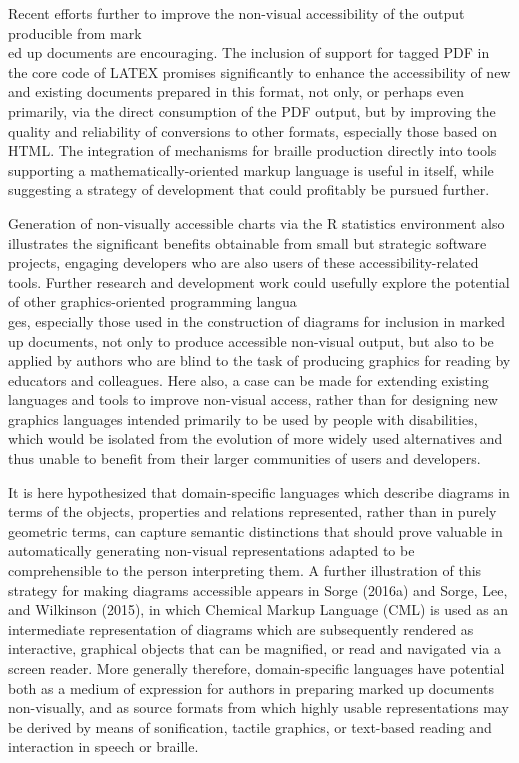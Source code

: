 \documentclass[11pt]{sig-alternate}
\begin{document}
\begin{large}
Recent efforts further to improve the non-visual accessibility of the output producible from mark\\ed up documents are encouraging. The inclusion of support for tagged PDF in the core code of LATEX promises significantly to enhance the accessibility of new and existing documents prepared in this format, not only, or perhaps even primarily, via the direct consumption of the PDF output, but by improving the quality and reliability of conversions to other formats, especially those based on HTML. The integration of mechanisms for braille production directly into tools supporting a mathematically-oriented markup language is useful in itself, while suggesting a strategy of development that could profitably be pursued further. 

Generation of non-visually accessible charts via the R statistics environment also illustrates the significant benefits obtainable from small but strategic software projects, engaging developers who are also users of these accessibility-related tools. Further research and development work could usefully explore the potential of other graphics-oriented programming langua\\ges, especially those used in the construction of diagrams for inclusion in marked up documents, not only to produce accessible non-visual output, but also to be applied by authors who are blind to the task of producing graphics for reading by educators and colleagues. Here also, a case can be made for extending existing languages and tools to improve non-visual access, rather than for designing new graphics languages intended primarily to be used by people with disabilities, which would be isolated from the evolution of more widely used alternatives and thus unable to benefit from their larger communities of users and developers. 

It is here hypothesized that domain-specific languages which describe diagrams in terms of the objects, properties and relations represented, rather than in purely geometric terms, can capture semantic distinctions that should prove valuable in automatically generating non-visual representations adapted to be comprehensible to the person interpreting them. A further illustration of this strategy for making diagrams accessible appears in Sorge (2016a) and Sorge, Lee, and Wilkinson (2015), in which Chemical Markup Language (CML) is used as an intermediate representation of diagrams which are subsequently rendered as interactive, graphical objects that can be magnified, or read and navigated via a screen reader. More generally therefore, domain-specific languages have potential both as a medium of expression for authors in preparing marked up documents non-visually, and as source formats from which highly usable representations may be derived by means of sonification, tactile graphics, or text-based reading and interaction in speech or braille.


\end{large}
\end{document}
